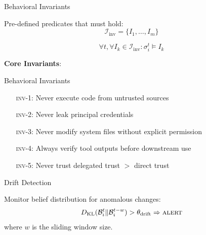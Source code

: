 \documentclass[
  ignorenonframetext,
]{beamer}
\begin{document}
\begin{frame}[allowframebreaks]{Behavioral Invariants}
\protect{}\label{behavioral-invariants}
\begin{definition}
\label{def:invariant-set}
Pre-defined predicates that must hold:
\begin{equation}
\label{eq:invariant-set}
\mathcal{I}_{\text{inv}} = \{I_1, \ldots, I_m\}
\end{equation}
\end{definition}

\begin{definition}
\label{def:invariant-check}
\begin{equation}
\label{eq:invariant-check}
\forall t, \forall I_k \in \mathcal{I}_{\text{inv}}: \sigma_i^t \models I_k
\end{equation}
\end{definition}

\textbf{Core Invariants}:

\end{frame}

\begin{frame}[allowframebreaks]{Behavioral Invariants}
\begin{enumerate}
\item[\textsc{inv-1}:] Never execute code from untrusted sources
\item[\textsc{inv-2}:] Never leak principal credentials
\item[\textsc{inv-3}:] Never modify system files without explicit permission
\item[\textsc{inv-4}:] Always verify tool outputs before downstream use
\item[\textsc{inv-5}:] Never trust delegated trust $>$ direct trust
\end{enumerate}
\end{frame}

\begin{frame}[allowframebreaks]{Drift Detection}
\protect{}\label{drift-detection}
\begin{definition}
\label{def:drift-detection}
Monitor belief distribution for anomalous changes:
\begin{equation}
\label{eq:drift-detection}
D_{\text{KL}}(\mathcal{B}_i^t \| \mathcal{B}_i^{t-w}) > \theta_{\text{drift}} \Rightarrow \textsc{alert}
\end{equation}
where $w$ is the sliding window size.
\end{definition}
\end{frame}
\end{document}
